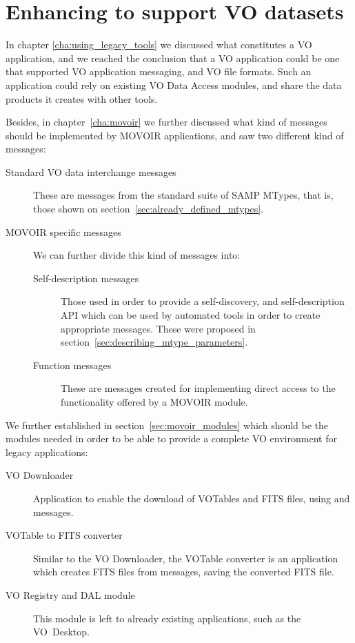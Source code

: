 \chapter{Enhancing \massa{} to support VO datasets}
\label{cha:massa_and_movoir}
	
	In chapter \ref{cha:using_legacy_tools} we discussed what
	constitutes a VO application, and we reached the
	conclusion that a VO application could be one that
	supported VO application messaging, and VO file formats.
	Such an application could rely on existing VO Data Access
	modules, and share the data products it creates with
	other tools.
	
	Besides, in chapter~\ref{cha:movoir} we further discussed what
	kind of messages should be implemented by MOVOIR applications,
	and saw two different kind of messages:
	
	\begin{description}
		\item[Standard VO data interchange messages] These
		are messages from the standard suite of SAMP MTypes,
		that is, those shown on
		section~\ref{sec:already_defined_mtypes}.
		
		\item[MOVOIR specific messages] We can further divide
		this kind of messages into:
		
		\begin{description}
			\item[Self-description messages] Those used in order
			to provide a self-dis\-cov\-e\-ry, and self-description
			API which can be used by automated tools in order
			to create appropriate messages. These were proposed
			in section~\ref{sec:describing_mtype_parameters}.
			
			\item[Function messages] These are messages created
			for implementing direct access to the functionality
			offered by a MOVOIR module.
		\end{description}
	\end{description}
	
	We further established in section~\ref{sec:movoir_modules} 
	which should be the modules needed in order to be able to
	provide a complete VO environment for legacy applications:
	
	\begin{description}
		\item[VO Downloader] Application to enable the download
		of VOTables and FITS files, using 
		and  messages.
		
		\item[VOTable to FITS converter] Similar to the VO
		Downloader, the VOTable converter is an application
		which creates FITS files from 
		messages, saving the converted FITS file.
		
		\item[VO Registry and DAL module] This module is left
		to already existing applications, such as the VO~Desktop.
	\end{description}

